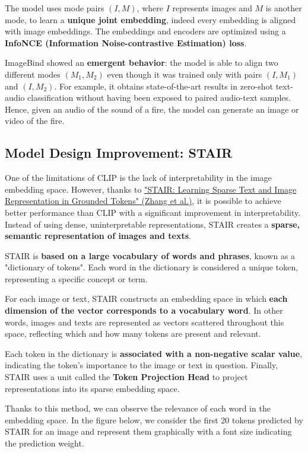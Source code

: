 The model uses mode pairs \((I, M)\), where \(I\) represents images and \(M\) is another mode, to learn a \textbf{unique joint embedding}, indeed every embedding is aligned with image embeddings. The embeddings and encoders are optimized using a \textbf{InfoNCE (Information Noise-contrastive Estimation) loss}.

ImageBind showed an \textbf{emergent behavior}: the model is able to align two different modes \((M_1, M_2)\) even though it was trained only with pairs \((I, M_1)\) and \((I, M_2)\). For example, it obtains state-of-the-art results in zero-shot text-audio classification without having been exposed to paired audio-text samples. Hence, given an audio of the sound of a fire, the model can generate an image or video of the fire.


\subsection{Model Design Improvement: STAIR}
One of the limitations of CLIP is the lack of interpretability in the image embedding space. However, thanks to \href{https://arxiv.org/pdf/2301.13081}{"STAIR: Learning Sparse Text and Image Representation in Grounded Tokens" (Zhang et al.)}, it is possible to achieve better performance than CLIP with a significant improvement in interpretability. Instead of using dense, uninterpretable representations, STAIR creates a \textbf{sparse, semantic representation of images and texts}. 

STAIR is \textbf{based on a large vocabulary of words and phrases}, known as a "dictionary of tokens". Each word in the dictionary is considered a unique token, representing a specific concept or term.

For each image or text, STAIR constructs an embedding space in which \textbf{each dimension of the vector corresponds to a vocabulary word}. In other words, images and texts are represented as vectors scattered throughout this space, reflecting which and how many tokens are present and relevant.

Each token in the dictionary is \textbf{associated with a non-negative scalar value}, indicating the token's importance to the image or text in question.  Finally, STAIR uses a unit called the \textbf{Token Projection Head} to project representations into its sparse embedding space.

Thanks to this method, we can observe the relevance of each word in the embedding space. In the figure below, we consider the first 20 tokens predicted by STAIR for an image and represent them graphically with a font size indicating the prediction weight.

